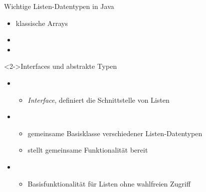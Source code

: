 \begin{frame}
    \begin{block}{Wichtige Listen-Datentypen in Java}
        \begin{itemize}
            \item klassische Arrays
            \item {}
            \item {}
        \end{itemize}
    \end{block}
    \begin{block}<2->{Interfaces und abstrakte Typen}
        \begin{itemize}
            \item {}
            \begin{itemize}
                \item \emph{Interface}, definiert die Schnittstelle von Listen
            \end{itemize}
            \item {}
            \begin{itemize}
                \item gemeinsame Basisklasse verschiedener Listen-Datentypen
                \item stellt gemeinsame Funktionalität bereit
            \end{itemize}
            \item {}
            \begin{itemize}
                \item Basisfunktionalität für Listen ohne wahlfreien Zugriff 
            \end{itemize}
        \end{itemize}
    \end{block}
\end{frame}
